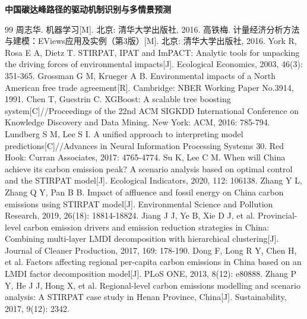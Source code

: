 \documentclass[12pt,a4paper]{ctexart}
\begin{document}
\setcounter{page}{1}

\begin{center}
{\bfseries 中国碳达峰路径的驱动机制识别与多情景预测}
\end{center}
\vspace{0.5em}










\begin{thebibliography}{99}
 周志华. 机器学习[M]. 北京: 清华大学出版社, 2016.
 高铁梅. 计量经济分析方法与建模：EViews应用及实例（第3版）[M]. 北京: 清华大学出版社, 2016.
 York R, Rosa E A, Dietz T. STIRPAT, IPAT and ImPACT: Analytic tools for unpacking the driving forces of environmental impacts[J]. Ecological Economics, 2003, 46(3): 351-365.
 Grossman G M, Krueger A B. Environmental impacts of a North American free trade agreement[R]. Cambridge: NBER Working Paper No.3914, 1991.
 Chen T, Guestrin C. XGBoost: A scalable tree boosting system[C]//Proceedings of the 22nd ACM SIGKDD International Conference on Knowledge Discovery and Data Mining. New York: ACM, 2016: 785-794.
 Lundberg S M, Lee S I. A unified approach to interpreting model predictions[C]//Advances in Neural Information Processing Systems 30. Red Hook: Curran Associates, 2017: 4765-4774.
 Su K, Lee C M. When will China achieve its carbon emission peak? A scenario analysis based on optimal control and the STIRPAT model[J]. Ecological Indicators, 2020, 112: 106138.
 Zhang Y L, Zhang Q Y, Pan B B. Impact of affluence and fossil energy on China carbon emissions using STIRPAT model[J]. Environmental Science and Pollution Research, 2019, 26(18): 18814-18824.
 Jiang J J, Ye B, Xie D J, et al. Provincial-level carbon emission drivers and emission reduction strategies in China: Combining multi-layer LMDI decomposition with hierarchical clustering[J]. Journal of Cleaner Production, 2017, 169: 178-190.
 Dong F, Long R Y, Chen H, et al. Factors affecting regional per-capita carbon emissions in China based on an LMDI factor decomposition model[J]. PLoS ONE, 2013, 8(12): e80888.
 Zhang P Y, He J J, Hong X, et al. Regional-level carbon emissions modelling and scenario analysis: A STIRPAT case study in Henan Province, China[J]. Sustainability, 2017, 9(12): 2342.

\end{thebibliography}
\end{document}

